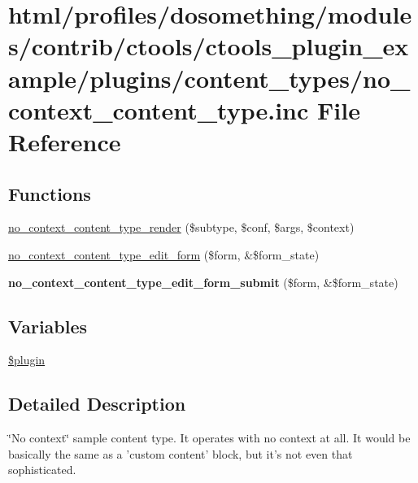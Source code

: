 \hypertarget{no__context__content__type_8inc}{
\section{html/profiles/dosomething/modules/contrib/ctools/ctools\_\-plugin\_\-example/plugins/content\_\-types/no\_\-context\_\-content\_\-type.inc File Reference}
\label{no__context__content__type_8inc}
}
\subsection*{Functions}
\begin{DoxyCompactItemize}
\item 
\hyperlink{no__context__content__type_8inc_a1df607eb28200db7681b82557042d769}{no\_\-context\_\-content\_\-type\_\-render} (\$subtype, \$conf, \$args, \$context)
\item 
\hyperlink{no__context__content__type_8inc_ab5b78ebf59abdb3b6568ed492a1b162f}{no\_\-context\_\-content\_\-type\_\-edit\_\-form} (\$form, \&\$form\_\-state)
\item 
\hypertarget{no__context__content__type_8inc_ab4faec269fc2445bafdc93c3a15a7748}{
{\bfseries no\_\-context\_\-content\_\-type\_\-edit\_\-form\_\-submit} (\$form, \&\$form\_\-state)}
\label{no__context__content__type_8inc_ab4faec269fc2445bafdc93c3a15a7748}

\end{DoxyCompactItemize}
\subsection*{Variables}
\begin{DoxyCompactItemize}
\item 
\hyperlink{no__context__content__type_8inc_ada8a7130088351710bb02ed622d6bf65}{\$plugin}
\end{DoxyCompactItemize}


\subsection{Detailed Description}
\char`\"{}No context\char`\"{} sample content type. It operates with no context at all. It would be basically the same as a 'custom content' block, but it's not even that sophisticated. 

